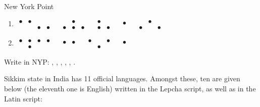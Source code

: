 \begin{refsection}
\begin{problem}{New York Point}{\namePLittell}{}
\begin{multicols}{2}
\begin{enumerate}
\item {\Large \boldmath$\begin{smallmatrix} 
    \bullet & \bullet & & \\  & & \bullet & \bullet 
\end{smallmatrix}$\ \ $\begin{smallmatrix}
  & \bullet &  \\  \bullet & \bullet & \bullet
\end{smallmatrix}$\ \ $\begin{smallmatrix}
  \bullet & \\ \bullet & \bullet
\end{smallmatrix}$\ \ $\begin{smallmatrix}
  \bullet \\ \, 
\end{smallmatrix}$\ \ $\begin{smallmatrix}
  & \bullet &  \\ \bullet& & \bullet
\end{smallmatrix}$}

\item {\Large \boldmath$\begin{smallmatrix} 
    \bullet & \bullet & \bullet & \bullet \\  & \bullet & &
\end{smallmatrix}$\ \ $\begin{smallmatrix}
  \bullet & \bullet \\  & 
\end{smallmatrix}$\ \ $\begin{smallmatrix}
  \bullet & & \bullet \\ & \bullet &
\end{smallmatrix}$\ \ $\begin{smallmatrix}
  \bullet \\ \,
\end{smallmatrix}$}
\end{enumerate}
\end{multicols}

\begin{assgts}
\item \detcorr
\item Write in NYP: , , , , , .
\end{assgts}
\end{problem}

\begin{problem}{\langnameLepcha}{\nameMChoudhury}{}
Sikkim state in India has 11 official languages. Amongst these, ten are given below (the eleventh one is English) written in the Lepcha script, as well as in the Latin script:


\end{problem}
\end{refsection}
